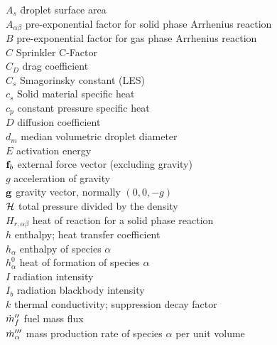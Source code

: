 \documentclass[11pt]{book}
\begin{document}
\begin{tabbing}
$A_s$ \hspace{1in}        \= droplet surface area \\
$A_{\alpha\beta}$          \> pre-exponential factor for solid phase Arrhenius reaction \\
$B$                       \> pre-exponential factor for gas phase Arrhenius reaction \\
$C$                       \> Sprinkler C-Factor \\
$C_D$                     \> drag coefficient \\
$C_s$                     \> Smagorinsky constant (LES)  \\
$c_s$             \> Solid material specific heat \\
$c_p$                     \> constant pressure specific heat \\
$D$                       \> diffusion coefficient   \\
$d_m$                     \> median volumetric droplet diameter \\
$E$                       \> activation energy \\
${\bf f}_b$                  \> external force vector (excluding gravity) \\
$g$                       \> acceleration of gravity \\
${\bf g}$                     \> gravity vector, normally $(0,0,-g)$ \\
$\cal H$                  \> total pressure divided by the density \\
$H_{r,\alpha\beta}$   \> heat of reaction for a solid phase reaction \\
$h$                       \> enthalpy; heat transfer coefficient   \\
$h_\alpha$                \> enthalpy of species $\alpha$   \\
$h_\alpha^0$              \> heat of formation of species $\alpha$   \\
$I$                       \> radiation intensity   \\
$I_b$                     \> radiation blackbody intensity   \\
$k$                       \> thermal conductivity; suppression decay factor \\
$\dot{m}_f''$                 \> fuel mass flux \\
$\dot{m}_\alpha'''$           \> mass production rate of species $\alpha$ per unit volume \\

\end{tabbing}
\end{document}
